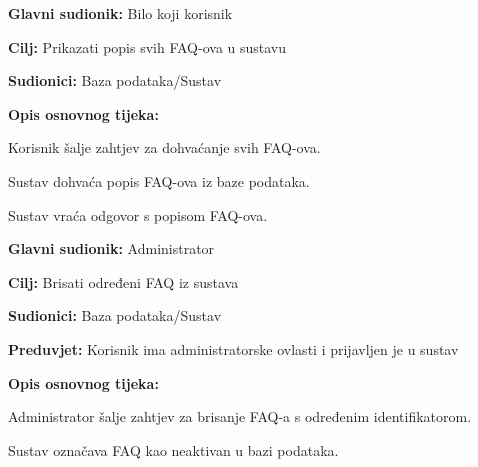 \noindent {}
\begin{packed_item}
	
	\item \textbf{Glavni sudionik: }Bilo koji korisnik
	\item  \textbf{Cilj:} Prikazati popis svih FAQ-ova u sustavu
	\item  \textbf{Sudionici:} Baza podataka/Sustav
	\item  \textbf{Opis osnovnog tijeka:}
	
	\item[] \begin{packed_enum}
		
		\item Korisnik šalje zahtjev za dohvaćanje svih FAQ-ova.
		\item Sustav dohvaća popis FAQ-ova iz baze podataka.
		\item Sustav vraća odgovor s popisom FAQ-ova.
		
	\end{packed_enum}
	
	
\end{packed_item}

\noindent {}
\begin{packed_item}
	
	\item \textbf{Glavni sudionik: }Administrator
	\item  \textbf{Cilj:} Brisati određeni FAQ iz sustava
	\item  \textbf{Sudionici:} Baza podataka/Sustav
	\item  \textbf{Preduvjet:} Korisnik ima administratorske ovlasti i prijavljen je u sustav
	\item  \textbf{Opis osnovnog tijeka:}
	
	\item[] \begin{packed_enum}
		
		\item Administrator šalje zahtjev za brisanje FAQ-a s određenim identifikatorom.
		\item Sustav označava FAQ kao neaktivan u bazi podataka.
		
	\end{packed_enum}
	
	
\end{packed_item}

